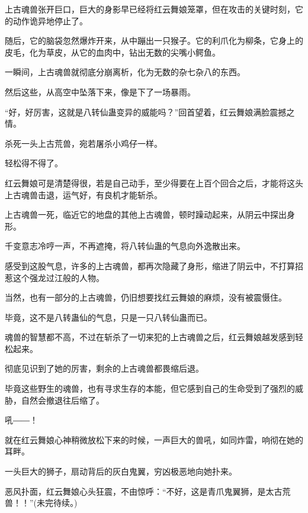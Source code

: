 \begin{this_body}
上古魂兽张开巨口，巨大的身影早已经将红云舞娘笼罩，但在攻击的关键时刻，它的动作诡异地停止了。

随后，它的脑袋忽然爆炸开来，从中蹦出一只猴子。它的利爪化为柳条，它身上的皮毛，化为草皮，从它的血肉中，钻出无数的尖嘴小鳄鱼。

一瞬间，上古魂兽就彻底分崩离析，化为无数的杂七杂八的东西。

然后这些，从高空中坠落下来，像是下了一场暴雨。

“好，好厉害，这就是八转仙蛊变异的威能吗？”回首望着，红云舞娘满脸震撼之情。

杀死一头上古荒兽，宛若屠杀小鸡仔一样。

轻松得不得了。

红云舞娘可是清楚得很，若是自己动手，至少得要在上百个回合之后，才能将这头上古魂兽击退，运气好，有良机才能斩杀。

上古魂兽一死，临近它的地盘的其他上古魂兽，顿时躁动起来，从阴云中探出身形。

千变意志冷哼一声，不再遮掩，将八转仙蛊的气息向外逸散出来。

感受到这股气息，许多的上古魂兽，都再次隐藏了身形，缩进了阴云中，不打算招惹这个强龙过江般的人物。

当然，也有一部分的上古魂兽，仍旧想要找红云舞娘的麻烦，没有被震慑住。

毕竟，这不是八转蛊仙的气息，只是一只八转仙蛊而已。

魂兽的智慧都不高，不过在斩杀了一切来犯的上古魂兽之后，红云舞娘越发感到轻松起来。

彻底见识到了她的厉害，剩余的上古魂兽都畏缩后退。

毕竟这些野生的魂兽，也有寻求生存的本能，但它感到自己的生命受到了强烈的威胁，自然会撤退往后缩了。

吼――！

就在红云舞娘心神稍微放松下来的时候，一声巨大的兽吼，如同炸雷，响彻在她的耳畔。

一头巨大的狮子，扇动背后的灰白鬼翼，穷凶极恶地向她扑来。

恶风扑面，红云舞娘心头狂震，不由惊呼：“不好，这是青爪鬼翼狮，是太古荒兽！！”(未完待续。)

\end{this_body}

